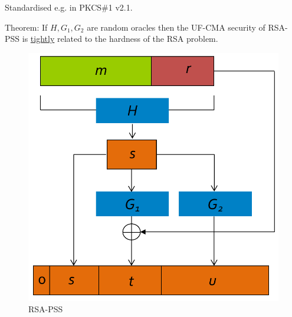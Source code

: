 Standardised e.g. in PKCS\#1 v2.1.

Theorem:
If $H, G_1, G_2$ are random oracles then the UF-CMA security of RSA-PSS is
\underline{tightly} related to the hardness of the RSA problem.

\begin{figure}[h]
    \centering
	\includegraphics[scale=0.3]{images/rsa-pss.png}
    \caption{RSA-PSS}
    \label{fig:rsa-pss}
\end{figure}

